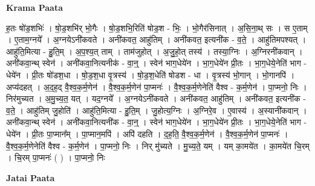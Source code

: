 \documentclass[17pt]{extarticle}
\begin{document}
\textbf{Krama Paata} \newline

ह॒तः षो॑ड॒शभिः॑ । षो॒ड॒शभि॑र् भो॒गैः । षो॒ड॒शभि॒रिति॑ षोड॒श - भिः॒ । भो॒गैर॑सिनात् । अ॒सि॒ना॒थ् सः । स ए॒ताम् । ए॒ताम॒ग्नये᳚ । अ॒ग्नयेऽनी॑कवते । अनी॑कवत॒ आहु॑तिम् । अनी॑कवत॒ इत्यनी॑क - व॒ते॒ । आहु॑तिमपश्यत् । आहु॑ति॒मित्या - हु॒ति॒म् । अ॒प॒श्य॒त् ताम् । ताम॑जुहोत् । अ॒जु॒हो॒त् तस्य॑ । तस्या॒ग्निः । अ॒ग्निरनी॑कवान् । अनी॑कवा॒न्थ् स्वेन॑ । अनी॑कवा॒नित्यनीक॑ - वा॒न्॒ । स्वेन॑ भाग॒धेये॑न । भा॒ग॒धेये॑न प्री॒तः । भा॒ग॒धेये॒नेति॑ भाग - धेये॑न । प्री॒तः षो॑डश॒धा । षो॒ड॒श॒धा वृ॒त्रस्य॑ । षो॒ड॒श॒धेति॑ षोडश - धा । वृ॒त्रस्य॑ भो॒गान् । भो॒गानपि॑ । अप्य॑दहत् । अ॒द॒ह॒द् वै॒श्व॒क॒र्म॒णेन॑ । वै॒श्व॒क॒र्म॒णेन॑ पा॒प्मनः॑ । वै॒श्व॒क॒र्म॒णेनेति॑ वैश्व - क॒र्म॒णेन॑ । पा॒प्मनो॒ निः । निर॑मुच्यत । अ॒मु॒च्य॒त॒ यत् । यद॒ग्नये᳚ । अ॒ग्नयेऽनी॑कवते । अनी॑कवत॒ आहु॑तिम् । अनी॑कवत॒ इत्यनी॑क - व॒ते॒ । आहु॑तिम् जु॒होति॑ । आहु॑ति॒मित्या - हु॒ति॒म् । जु॒होत्य॒ग्निः । अ॒ग्निरे॒व । ए॒वास्य॑ । अ॒स्यानी॑कवान् । अनी॑कवा॒न्थ् स्वेन॑ । अनी॑कवा॒नित्यनी॑क - वा॒न्॒ । स्वेन॑ भाग॒धेये॑न । भा॒ग॒धेये॑न प्री॒तः । भा॒ग॒धेये॒नेति॑ भाग - धेये॑न । प्री॒तः पा॒प्मान᳚म् । पा॒प्मान॒मपि॑ । अपि॑ दहति । द॒ह॒ति॒ वै॒श्व॒क॒र्म॒णेन॑ । वै॒श्व॒क॒र्म॒णेन॑ पा॒प्मनः॑ । वै॒श्व॒क॒र्म॒णेनेति॑ वैश्व - क॒र्म॒णेन॑ । पा॒प्मनो॒ निः । निर् मु॑च्यते । मु॒च्य॒ते॒ यम् । यम् का॒मये॑त । का॒मये॑त चि॒रम् । चि॒रम् पा॒प्मनः॑ ( ) । पा॒प्मनो॒ निः \newline

\textbf{Jatai Paata} \newline
\end{document}
